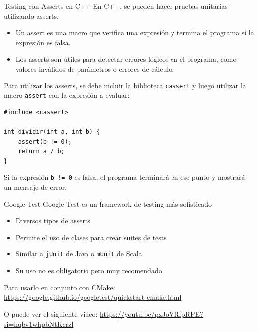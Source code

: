 \documentclass{beamer}
\begin{document}
\begin{frame}[fragile]{Testing con Asserts en C++}
En C++, se pueden hacer pruebas unitarias utilizando asserts. 

\begin{itemize}
\item Un assert es una macro que verifica una expresión y termina el programa si la expresión es falsa.
\item Los asserts son útiles para detectar errores lógicos en el programa, como valores inválidos de parámetros o errores de cálculo.
\end{itemize}

Para utilizar los asserts, se debe incluir la biblioteca \texttt{cassert} y luego utilizar la macro \texttt{assert} con la expresión a evaluar:

\begin{verbatim}
#include <cassert>

int dividir(int a, int b) {
    assert(b != 0);
    return a / b;
}
\end{verbatim}

Si la expresión \texttt{b != 0} es falsa, el programa terminará en ese punto y mostrará un mensaje de error.

\end{frame}
%
\begin{frame}[fragile]{Google Test}
Google Test es un framework de testing más sofisticado

\begin{itemize}
\item Diversos tipos de asserts
\item Permite el uso de clases para crear suites de tests
\item Similar a \texttt{jUnit} de Java o \texttt{mUnit} de Scala
\item Su uso no es obligatorio pero muy recomendado
\end{itemize}

Para usarlo en conjunto con CMake: \url{https://google.github.io/googletest/quickstart-cmake.html}

O puede ver el siguiente video: \url{https://youtu.be/pxJoVRfpRPE?si=hqbv1whpbNtKcrzl}

\end{frame}
%
\end{document}
